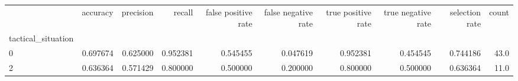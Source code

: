 \begin{tabular}{lrrrrrrrrr}
\toprule
{} &  accuracy &  precision &    recall &  false positive rate &  false negative rate &  true positive rate &  true negative rate &  selection rate &  count \\
tactical\_situation &           &            &           &                      &                      &                     &                     &                 &        \\
\midrule
0                  &  0.697674 &   0.625000 &  0.952381 &             0.545455 &             0.047619 &            0.952381 &            0.454545 &        0.744186 &   43.0 \\
2                  &  0.636364 &   0.571429 &  0.800000 &             0.500000 &             0.200000 &            0.800000 &            0.500000 &        0.636364 &   11.0 \\
\bottomrule
\end{tabular}
